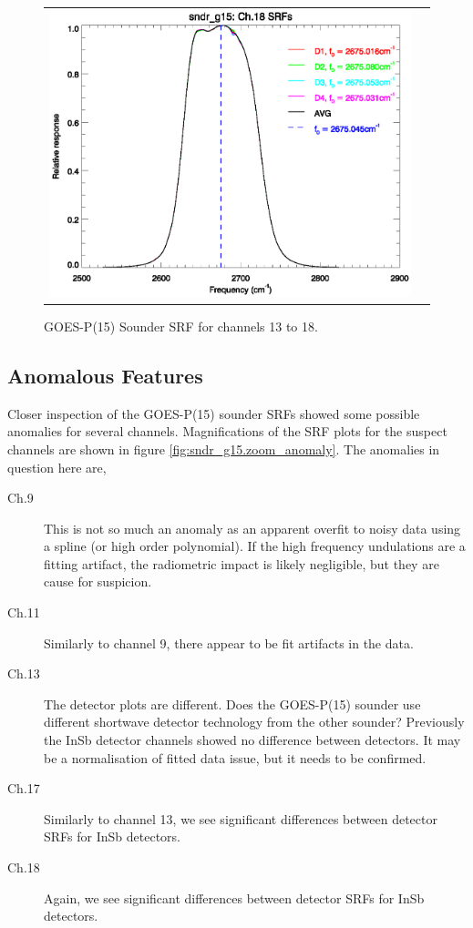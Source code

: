 \begin{figure}[htp]
\begin{tabular}{c c}
    \includegraphics[scale=0.5]{graphics/nominal/sndr_g15.ch18.srf.eps}
  \end{tabular}
  \caption{GOES-P(15) Sounder SRF for channels 13 to 18.}
  \label{fig:sndr_g15.ch13-18}
\end{figure}

\subsection{Anomalous Features}
Closer inspection of the GOES-P(15) sounder SRFs showed some possible anomalies for several channels. Magnifications of the SRF plots for the suspect channels are shown in figure \ref{fig:sndr_g15.zoom_anomaly}. The anomalies in question here are,
\begin{description}
  \item[Ch.9] This is not so much an anomaly as an apparent overfit to noisy data using a spline (or high order polynomial). If the high frequency undulations are a fitting artifact, the radiometric impact is likely negligible, but they are cause for suspicion.
  \item[Ch.11] Similarly to channel 9, there appear to be fit artifacts in the data.
  \item[Ch.13] The detector plots are different. Does the GOES-P(15) sounder use different shortwave detector technology from the other sounder? Previously the InSb detector channels showed no difference between detectors. It may be a normalisation of fitted data issue, but it needs to be confirmed.
  \item[Ch.17] Similarly to channel 13, we see significant differences between detector SRFs for InSb detectors.
  \item[Ch.18] Again, we see significant differences between detector SRFs for InSb detectors.
\end{description}


